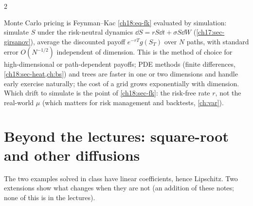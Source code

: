 \begin{paracol}{2}
\begin{finance}
Monte Carlo pricing is Feynman--Kac \eqref{ch18:eq-fk} evaluated by simulation: simulate $S$ under the risk-neutral dynamics $\dd S=rS\dd t+\sigma S\dd W$ (\cref{ch17:sec-girsanov}), average the discounted payoff $e^{-rT}g(S_T)$ over $N$ paths, with standard error $O(N^{-1/2})$ independent of dimension. This is the method of choice for high-dimensional or path-dependent payoffs; PDE methods (finite differences, \cref{ch18:sec-heat,ch:bs}) and trees are faster in one or two dimensions and handle early exercise naturally; the cost of a grid grows exponentially with dimension. Which drift to simulate is the point of \cref{ch18:sec-fk}: the risk-free rate $r$, not the real-world $\mu$ (which matters for risk management and backtests, \cref{ch:var}).
\end{finance}

\section{Beyond the lectures: square-root and other diffusions}\label{ch18:sec-cir}

The two examples solved in class have linear coefficients, hence Lipschitz. Two extensions show what changes when they are not (an addition of these notes; none of this is in the lectures).


\end{paracol}
